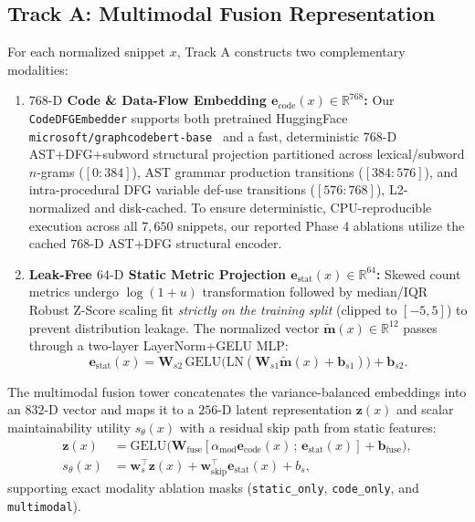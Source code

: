 \documentclass[conference]{IEEEtran}
\begin{document}
\subsection{Track A: Multimodal Fusion Representation}
For each normalized snippet $x$, Track A constructs two complementary modalities:
\begin{enumerate}
    \item \textbf{$768\text{-D}$ Code \& Data-Flow Embedding $\mathbf{e}_{\text{code}}(x) \in \mathbb{R}^{768}$:} Our \texttt{CodeDFGEmbedder} supports both pretrained HuggingFace \texttt{microsoft/graphcodebert-base}~\cite{guo2021graphcodebert} and a fast, deterministic $768\text{-D}$ AST+DFG+subword structural projection partitioned across lexical/subword $n$-grams ($[0\!:\!384]$), AST grammar production transitions ($[384\!:\!576]$), and intra-procedural DFG variable def-use transitions ($[576\!:\!768]$), L2-normalized and disk-cached. To ensure deterministic, CPU-reproducible execution across all $7{,}650$ snippets, our reported Phase 4 ablations utilize the cached $768\text{-D}$ AST+DFG structural encoder.
    \item \textbf{Leak-Free $64\text{-D}$ Static Metric Projection $\mathbf{e}_{\text{stat}}(x) \in \mathbb{R}^{64}$:} Skewed count metrics undergo $\log(1+u)$ transformation followed by median/IQR Robust Z-Score scaling fit \emph{strictly on the training split} (clipped to $[-5, 5]$) to prevent distribution leakage. The normalized vector $\tilde{\mathbf{m}}(x)\in\mathbb{R}^{12}$ passes through a two-layer LayerNorm+GELU MLP:
    \begin{equation}
        \mathbf{e}_{\text{stat}}(x) = \mathbf{W}_{s2}\,\text{GELU}\big(\text{LN}(\mathbf{W}_{s1}\tilde{\mathbf{m}}(x) + \mathbf{b}_{s1})\big) + \mathbf{b}_{s2}.
    \end{equation}
\end{enumerate}

The multimodal fusion tower concatenates the variance-balanced embeddings into an $832\text{-D}$ vector and maps it to a $256\text{-D}$ latent representation $\mathbf{z}(x)$ and scalar maintainability utility $s_\theta(x)$ with a residual skip path from static features:
\begin{align}
    \mathbf{z}(x) &= \text{GELU}\big(\mathbf{W}_{\text{fuse}}[\alpha_{\text{mod}}\mathbf{e}_{\text{code}}(x)\,;\,\mathbf{e}_{\text{stat}}(x)] + \mathbf{b}_{\text{fuse}}\big), \\
    s_\theta(x) &= \mathbf{w}_s^\top \mathbf{z}(x) + \mathbf{w}_{\text{skip}}^\top \mathbf{e}_{\text{stat}}(x) + b_s,
\end{align}
supporting exact modality ablation masks (\texttt{static\_only}, \texttt{code\_only}, and \texttt{multimodal}).
\end{document}

